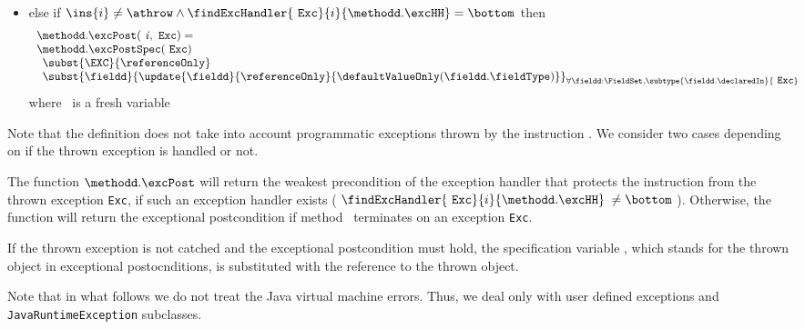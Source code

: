 \begin{defExc}
\begin{itemize}
    \item else if $\ins{i} \neq \athrow \wedge    \findExcHandler{ \mbox{ \rm \texttt{Exc}}   }{i}{\methodd.\excHH} = \bottom $ then 
            $$\begin{array}{l}
                    \methodd.\excPost( \mbox{ \rm \textit{i}} ,  \mbox{ \rm \texttt{Exc}}) = \\
                        \methodd.\excPostSpec( \mbox{ \rm \texttt{Exc}}  ) \\
                     \begin{array}{l}
		           \subst{ \EXC }{\referenceOnly  }\\
                          \subst{ \fieldd}{ \update{\fieldd } { \referenceOnly }{\defaultValueOnly( \fieldd.\fieldType ) } }_{ {\small \forall \fieldd: \FieldSet, 
			   \subtype{\fieldd.\declaredIn}{ \mbox{ \rm \texttt{Exc}}} } }    \\
                    \end{array}  
             \end{array} $$
	where  \ is a fresh variable
    




\end{itemize}
\end{defExc}
Note that the definition does not take into account programmatic exceptions thrown by the instruction \athrow.
We consider two cases depending on if  the thrown exception   is handled or not.

The function $\methodd.\excPost$ will return the weakest precondition of the exception handler that protects the instruction from the thrown exception \texttt{Exc},
if such an exception handler exists ( $  \findExcHandler{\mbox{ \rm \texttt{Exc}} }{i}{\methodd.\excHH} $ $ \neq \bottom $ ). 
Otherwise, the function will return the exceptional postcondition if method \methodd \ terminates on
an exception  \texttt{Exc}.
  
 If the thrown exception is not catched  and the exceptional postcondition must hold, the specification variable \EXC, which stands for the thrown object in exceptional 
postocnditions, is substituted with the reference to the thrown object.


Note that in what follows we do not treat the Java virtual machine errors. Thus, we deal only with user defined exceptions and
 \texttt{JavaRuntimeException} subclasses.

